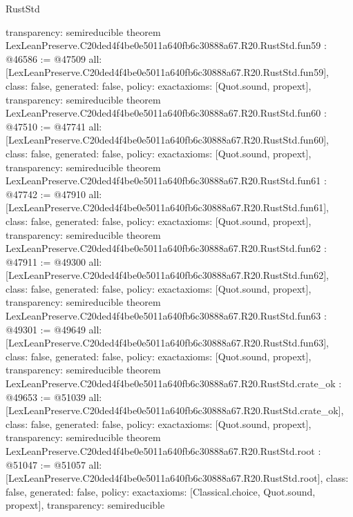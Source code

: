 \begin{lexlean}{RustStd}
\begin{coremodule}
{  transparency: semireducible
}
theorem LexLeanPreserve.C20ded4f4be0e5011a640fb6c30888a67.R20.RustStd.fun59 : @46586 := @47509 {
  all: [LexLeanPreserve.C20ded4f4be0e5011a640fb6c30888a67.R20.RustStd.fun59],
  class: false,
  generated: false,
  policy: exact{axioms: [Quot.sound, propext]},
  transparency: semireducible
}
theorem LexLeanPreserve.C20ded4f4be0e5011a640fb6c30888a67.R20.RustStd.fun60 : @47510 := @47741 {
  all: [LexLeanPreserve.C20ded4f4be0e5011a640fb6c30888a67.R20.RustStd.fun60],
  class: false,
  generated: false,
  policy: exact{axioms: [Quot.sound, propext]},
  transparency: semireducible
}
theorem LexLeanPreserve.C20ded4f4be0e5011a640fb6c30888a67.R20.RustStd.fun61 : @47742 := @47910 {
  all: [LexLeanPreserve.C20ded4f4be0e5011a640fb6c30888a67.R20.RustStd.fun61],
  class: false,
  generated: false,
  policy: exact{axioms: [Quot.sound, propext]},
  transparency: semireducible
}
theorem LexLeanPreserve.C20ded4f4be0e5011a640fb6c30888a67.R20.RustStd.fun62 : @47911 := @49300 {
  all: [LexLeanPreserve.C20ded4f4be0e5011a640fb6c30888a67.R20.RustStd.fun62],
  class: false,
  generated: false,
  policy: exact{axioms: [Quot.sound, propext]},
  transparency: semireducible
}
theorem LexLeanPreserve.C20ded4f4be0e5011a640fb6c30888a67.R20.RustStd.fun63 : @49301 := @49649 {
  all: [LexLeanPreserve.C20ded4f4be0e5011a640fb6c30888a67.R20.RustStd.fun63],
  class: false,
  generated: false,
  policy: exact{axioms: [Quot.sound, propext]},
  transparency: semireducible
}
theorem LexLeanPreserve.C20ded4f4be0e5011a640fb6c30888a67.R20.RustStd.crate_ok : @49653 := @51039 {
  all: [LexLeanPreserve.C20ded4f4be0e5011a640fb6c30888a67.R20.RustStd.crate_ok],
  class: false,
  generated: false,
  policy: exact{axioms: [Quot.sound, propext]},
  transparency: semireducible
}
theorem LexLeanPreserve.C20ded4f4be0e5011a640fb6c30888a67.R20.RustStd.root : @51047 := @51057 {
  all: [LexLeanPreserve.C20ded4f4be0e5011a640fb6c30888a67.R20.RustStd.root],
  class: false,
  generated: false,
  policy: exact{axioms: [Classical.choice, Quot.sound, propext]},
  transparency: semireducible
}


\end{coremodule}
\end{lexlean}
